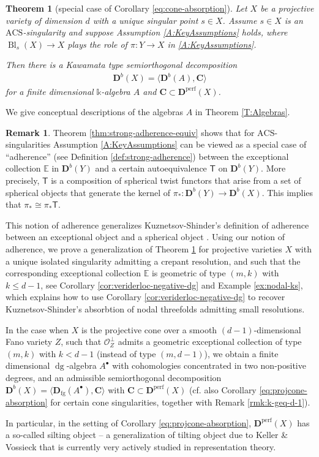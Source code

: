 \documentclass[a4paper,11pt, reqno]{amsart}
\def\CC{\mathbf C}
\def\DD{\mathbf D}
\def\OO{\mathcal O}
\def\Bl{{\operatorname{Bl}}}
\def\dg{{\operatorname{dg}}}
\def\Db{\DD^b}
\def\Dperf{\DD^{\mathrm{perf}}}
\newcommand{\bT}{\mathsf{T}}
\theoremstyle{plain}
\newtheorem{theorem}[dummy]{Theorem}
\theoremstyle{definition}
\newtheorem{remark}[dummy]{Remark}
\numberwithin{equation}{section}
\begin{document}
\begin{theorem}[special case of Corollary \ref{eq:cone-absorption}] \label{T:IntroMain}
Let $X$ be a projective variety of dimension $d$ with a unique singular point $s \in X$. 
Assume $s\in X$ is an $\mathrm{ACS}$-singularity 
and suppose Assumption \ref{A:KeyAssumptions} holds, where $  \Bl_s ( X) \to X$ plays the role of $\pi\colon Y \to X$ in \ref{A:KeyAssumptions}.

Then there is a Kawamata type semiorthogonal decomposition \begin{align}\label{E:KSODIntro}
\Db(X)=\langle \Db(A), \CC \rangle\end{align} for a finite dimensional $\mathbb{k}$-algebra $A$ and $\CC \subset \Dperf(X)$. 
\end{theorem}

 We give conceptual descriptions of the algebras $A$ in Theorem \ref{T:Algebras}. 

\begin{remark}\label{rmk:silting}
    Theorem \ref{thm:strong-adherence-equiv} shows that for $\mathrm{ACS}$-singularities Assumption \ref{A:KeyAssumptions} can be viewed as a special case of ``adherence'' (see Definition \ref{def:strong-adherence}) between the exceptional collection $\mathbb{E}$ in $\Db(Y)$ and a certain autoequivalence $\bT$ on $\Db(Y)$. More precisely, $\bT$ is a composition of spherical twist functors that arise from a set of spherical objects that generate the kernel of $\pi_*\colon \Db(Y) \to \Db(X)$. This implies that $\pi_* \cong \pi_* \bT$. 
    
    
    This notion of adherence generalizes Kuznetsov-Shinder's definition of adherence between an exceptional object and a spherical object \cite{ks}.
    Using our notion of adherence, we prove a generalization of Theorem \ref{T:IntroMain} for projective varieties $X$ with a unique isolated singularity  admitting a crepant resolution, and such that the corresponding exceptional collection $\mathbb{E}$ is geometric of type $(m, k)$ with $k \leq d-1$, see Corollary \ref{cor:veriderloc-negative-dg} and Example \ref{ex:nodal-ks}, which explains how to use Corollary \ref{cor:veriderloc-negative-dg} to recover Kuznetsov-Shinder's absorbtion of nodal threefolds admitting small resolutions.
    
    In the case when $X$ is the projective cone over a smooth $(d-1)$-dimensional Fano variety $Z$, such that $\OO_Z^{\perp}$ admits a geometric exceptional collection of type  $(m,k)$ with $k < d-1$ (instead of type $(m, d-1)$),  
     we obtain a finite dimensional $\dg$-algebra $A^\bullet$ with cohomologies concentrated in two non-positive degrees, and an admissible semiorthogonal decomposition  $\Db(X)=\langle \DD_{\mathrm{fg}} (A^\bullet), \CC\rangle$ with $\CC \subset \Dperf(X)$ (cf. also Corollary \ref{eq:projcone-absorption} for certain cone singularities, together with Remark \ref{rmk:k-geq-d-1}). 
     
    In particular, in the setting of 
    Corollary \ref{eq:projcone-absorption},
    $\Dperf(X)$ has a so-called silting object -- a generalization of tilting object due to Keller \& Vossieck that is currently very actively studied in representation theory.
\end{remark}
\end{document}

